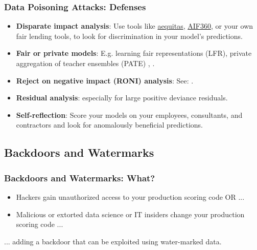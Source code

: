 \documentclass[11pt,
               aspectratio=169,
               hyperref={colorlinks}
               ]{beamer}
\begin{document}
			\begin{frame}[label={slide:data_poisoning_defense}]
		
				\frametitle{Data Poisoning Attacks: \textbf{Defenses}}
				
				\begin{itemize}
					\item \textbf{Disparate impact analysis}: Use tools like \href{https://github.com/dssg/aequitas}{aequitas}, \href{https://github.com/IBM/AIF360}{AIF360}, or your own fair lending tools, to look for discrimination in your model’s predictions. 
					\item \textbf{Fair or private models}: E.g. learning fair representations (LFR), private aggregation of teacher ensembles (PATE) \cite{pate}, \cite{lfr}.
					\item \textbf{Reject on negative impact (RONI) analysis}: See: \textit{} \cite{security_of_ml}. 		
					\item \textbf{Residual analysis}: especially for large positive deviance residuals.
					\item \textbf{Self-reflection}: Score your models on your employees, consultants, and contractors and look for anomalously beneficial predictions.
				\end{itemize}	
			\end{frame}
		
		\subsection{Backdoors and Watermarks}
			
			\begin{frame}
		
				\frametitle{Backdoors and Watermarks: \textbf{What?}}
				\begin{itemize}
				\item Hackers gain unauthorized access to your production scoring code OR ... 
				\item Malicious or extorted data science or IT insiders change your production scoring code ... 
				\end{itemize}
				\vspace{20pt}
\hspace{10pt} ... adding a backdoor that can be exploited using water-marked data.
			
			\end{frame}
		
\end{document}

